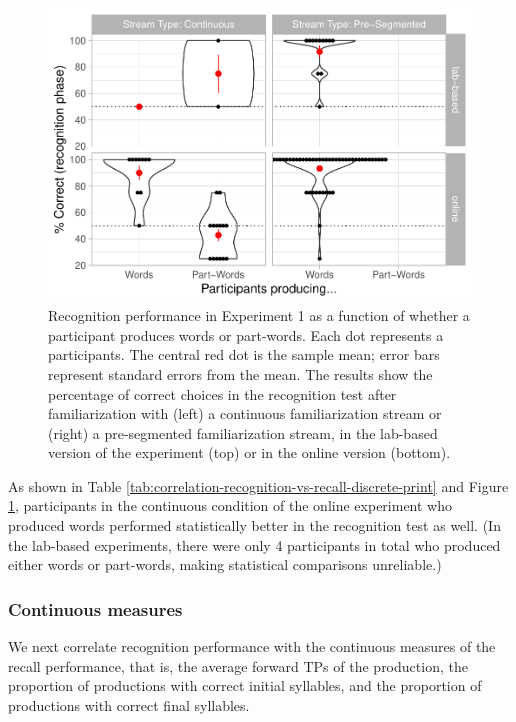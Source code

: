 \documentclass[
]{article}
\begin{document}
\begin{figure}

{\centering \includegraphics[width=0.8\linewidth]{segmentation_recall_combined_for_revision2_files/figure-latex/correlation-recognition-vs-recall-discrete-plot-1} 

}

\caption{Recognition performance in Experiment 1 as a function of whether a participant produces words or part-words. Each dot represents a participants. The central red dot is the sample mean; error bars represent standard errors from the mean. The results show the percentage of correct choices in the recognition test after familiarization with (left) a continuous familiarization stream or (right) a pre-segmented familiarization stream, in the lab-based version of the experiment (top) or in the online version (bottom).}\label{fig:correlation-recognition-vs-recall-discrete-plot}
\end{figure}

As shown in Table
\ref{tab:correlation-recognition-vs-recall-discrete-print} and Figure
\ref{fig:correlation-recognition-vs-recall-discrete-plot}, participants
in the continuous condition of the online experiment who produced words
performed statistically better in the recognition test as well. (In the
lab-based experiments, there were only 4 participants in total who
produced either words or part-words, making statistical comparisons
unreliable.)

\hypertarget{continuous-measures}{%
\subsubsection{Continuous measures}\label{continuous-measures}}

We next correlate recognition performance with the continuous measures
of the recall performance, that is, the average forward TPs of the
production, the proportion of productions with correct initial
syllables, and the proportion of productions with correct final
syllables.
\end{document}
